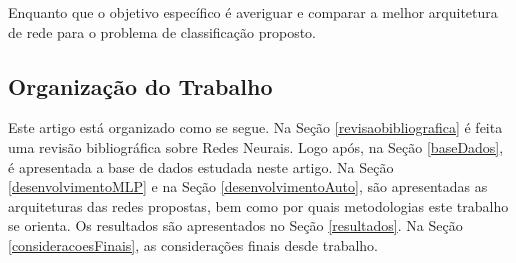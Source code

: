 Enquanto que o objetivo específico é averiguar e comparar a melhor arquitetura de rede para o problema de classificação proposto.


\subsection{Organização do Trabalho}

Este artigo está organizado como se segue. Na Seção \ref{revisaobibliografica} é feita uma revisão bibliográfica sobre Redes Neurais. Logo após, na Seção \ref{baseDados}, é apresentada a base de dados estudada neste artigo. Na Seção \ref{desenvolvimentoMLP} e na Seção \ref{desenvolvimentoAuto}, são apresentadas as arquiteturas das redes propostas, bem como por quais metodologias este trabalho se orienta. Os resultados são apresentados no Seção \ref{resultados}. Na Seção \ref{consideracoesFinais}, as considerações finais desde trabalho.